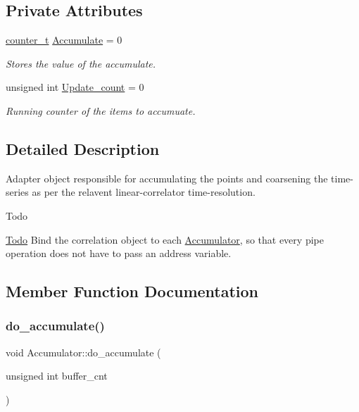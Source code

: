 \subsection*{Private Attributes}
\begin{DoxyCompactItemize}
\item 
\hyperlink{types_8hpp_a22f279793847eba127de149437848c48}{counter\+\_\+t} \hyperlink{classAccumulator_a8e615af8b85dd2c8500d1f8c473879ab}{Accumulate} = 0
\begin{DoxyCompactList}\small\item\em Stores the value of the accumulate. \end{DoxyCompactList}\item 
unsigned int \hyperlink{classAccumulator_afb010cbe82265d22e5d577033574a16b}{Update\+\_\+count} = 0
\begin{DoxyCompactList}\small\item\em Running counter of the items to accumuate. \end{DoxyCompactList}\end{DoxyCompactItemize}


\subsection{Detailed Description}
Adapter object responsible for accumulating the points and coarsening the time-\/series as per the relavent linear-\/correlator time-\/resolution. 

\begin{DoxyRefDesc}{Todo}
\item[\hyperlink{todo__todo000001}{Todo}]Bind the correlation object to each \hyperlink{classAccumulator}{Accumulator}, so that every {\ttfamily pipe} operation does not have to pass an address variable. \end{DoxyRefDesc}


\subsection{Member Function Documentation}
\mbox{\label{classAccumulator_adab342ee6d376a45ed38fe1e1679a1e2}} 
\subsubsection{\texorpdfstring{do\+\_\+accumulate()}{do\_accumulate()}}
{\footnotesize\ttfamily void Accumulator\+::do\+\_\+accumulate (\begin{DoxyParamCaption}\item[{unsigned int}]{buffer\+\_\+cnt }\end{DoxyParamCaption})\hspace{0.3cm}{\ttfamily [inline]}}



